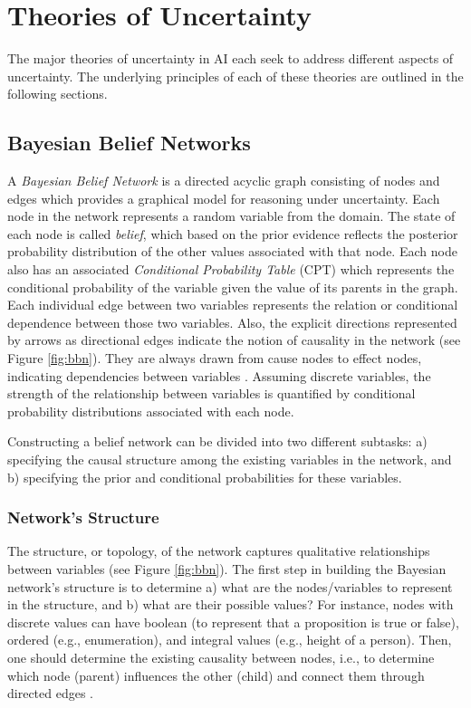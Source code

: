 \documentclass[11pt]{article}
\begin{document}
\section{Theories of Uncertainty}

The major theories of uncertainty in AI each seek to address different aspects
of uncertainty. The underlying principles of each of these theories are outlined
in the following sections.

\subsection{Bayesian Belief Networks}
\label{sec:bbn}

A \textit{Bayesian Belief Network} \cite{pearl:probabilistic-reasoning} is a 
directed acyclic graph consisting of nodes and edges which provides a graphical
model for reasoning under uncertainty. Each node in the network represents a
random variable from the domain. The state of each node is called
\textit{belief}, which based on the prior evidence reflects the posterior
probability distribution of the other values associated with that node. Each
node also has an associated \textit{Conditional Probability Table} (CPT) which
represents the conditional probability of the variable given the value of its
parents in the graph. Each individual edge between two variables represents the
relation or conditional dependence between those two variables. Also, the
explicit directions represented by arrows as directional edges indicate the
notion of causality in the network (see Figure \ref{fig:bbn}). They are always
drawn from cause nodes to effect nodes, indicating dependencies between
variables \cite{das:decision-making-agents}. Assuming discrete variables, the
strength of the relationship between variables is quantified by conditional
probability distributions associated with each node.

Constructing a belief network can be divided into two different subtasks: a)
specifying the causal structure among the existing variables in the network, and
b) specifying the prior and conditional probabilities for these variables.

\subsubsection{Network's Structure}

The structure, or topology, of the network captures qualitative relationships
between variables (see Figure \ref{fig:bbn}). The first step in building the
Bayesian network's structure is to determine a) what are the nodes/variables to
represent in the structure, and b) what are their possible values? For instance,
nodes with discrete values can have boolean (to represent that a proposition is
true or false), ordered (e.g., enumeration), and integral values (e.g., height
of a person). Then, one should determine the existing causality between nodes,
i.e., to determine which node (parent) influences the other (child) and connect
them through directed edges \cite{korb:bayesian-ai}.
\end{document}
